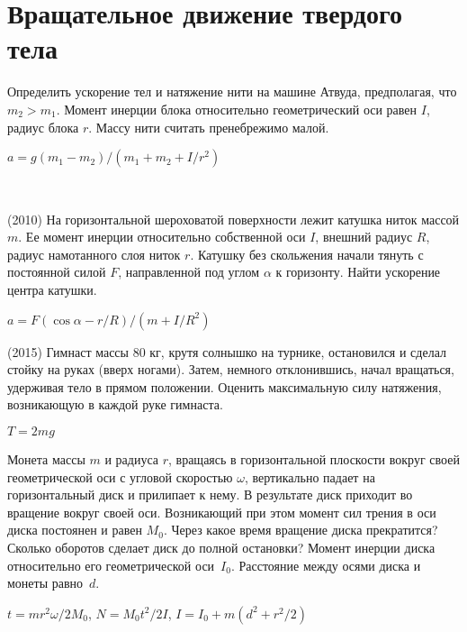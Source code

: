 \section{Вращательное движение твердого тела}

\begin{ex}
Определить ускорение тел и натяжение нити на машине Атвуда, предполагая, что $m_2>m_1$. Момент инерции блока относительно геометрический оси равен $I$, радиус блока $r$. Массу нити считать пренебрежимо малой. 
\begin{ans}
$a=g(m_1-m_2)/(m_1 +m_2 + I/r^2)$
\end{ans}
\end{ex}

\begin{ex}
\hspace{0pt} \\
\begin{minipage}{.65\textwidth}
(2010) На горизонтальной шероховатой поверхности лежит катушка ниток массой $m$. Ее момент инерции относительно собственной оси $I$, внешний радиус $R$, радиус намотанного слоя ниток $r$. Катушку без скольжения начали тянуть с постоянной силой $F$, направленной под углом $\alpha$ к горизонту. Найти ускорение центра катушки.
\end{minipage}
\begin{minipage}{.35\textwidth}
\centering

\end{minipage}
\begin{ans}
$a = F(\cos \alpha - r/R)/(m+I/R^2)$
\end{ans}
\end{ex}

\begin{ex}
(2015) Гимнаст массы 80 кг, крутя солнышко на турнике, остановился и сделал стойку на руках (вверх ногами). Затем, немного отклонившись, начал вращаться, удерживая тело в прямом положении. Оценить максимальную силу натяжения, возникающую в каждой руке гимнаста.
\begin{ans}
$T=2mg$
\end{ans}
\end{ex}

\begin{ex}
Монета массы $m$ и радиуса $r$, вращаясь в горизонтальной плоскости вокруг своей геометрической оси с угловой скоростью $\omega$, вертикально падает на горизонтальный диск и прилипает к нему. В результате диск приходит во вращение вокруг своей оси. Возникающий при этом момент сил трения в оси диска постоянен и равен $M_0$. Через какое время вращение диска прекратится? Сколько оборотов сделает диск до полной остановки? Момент инерции диска относительно его геометрической оси~$I_0$. Расстояние между осями диска и монеты равно~$d$.
\begin{ans}
$t=mr^2\omega/2M_0$, $N=M_0t^2/2I$, $I = I_0+m(d^2+r^2/2)$
\end{ans}
\end{ex}

